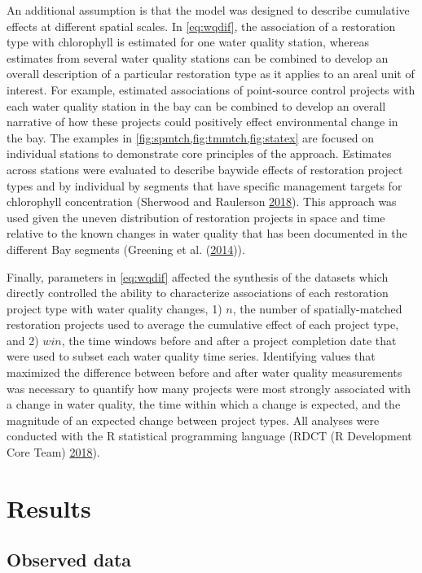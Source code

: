 \documentclass[]{article}
\begin{document}
An additional assumption is that the model was designed to describe
cumulative effects at different spatial scales. In \cref{eq:wqdif}, the
association of a restoration type with chlorophyll is estimated for one
water quality station, whereas estimates from several water quality
stations can be combined to develop an overall description of a
particular restoration type as it applies to an areal unit of interest.
For example, estimated associations of point-source control projects
with each water quality station in the bay can be combined to develop an
overall narrative of how these projects could positively effect
environmental change in the bay. The examples in
\cref{fig:spmtch,fig:tmmtch,fig:statex} are focused on individual
stations to demonstrate core principles of the approach. Estimates
across stations were evaluated to describe baywide effects of
restoration project types and by individual by segments that have
specific management targets for chlorophyll concentration (Sherwood and
Raulerson \protect\hyperlink{ref-Sherwood18}{2018}). This approach was
used given the uneven distribution of restoration projects in space and
time relative to the known changes in water quality that has been
documented in the different Bay segments (Greening et al.
(\protect\hyperlink{ref-Greening2014}{2014})).

Finally, parameters in \cref{eq:wqdif} affected the synthesis of the
datasets which directly controlled the ability to characterize
associations of each restoration project type with water quality
changes, 1) \(n\), the number of spatially-matched restoration projects
used to average the cumulative effect of each project type, and 2)
\(win\), the time windows before and after a project completion date
that were used to subset each water quality time series. Identifying
values that maximized the difference between before and after water
quality measurements was necessary to quantify how many projects were
most strongly associated with a change in water quality, the time within
which a change is expected, and the magnitude of an expected change
between project types. All analyses were conducted with the R
statistical programming language (RDCT (R Development Core Team)
\protect\hyperlink{ref-RDCT18}{2018}).

\hypertarget{results}{%
\section{Results}\label{results}}

\hypertarget{observed-data}{%
\subsection{Observed data}\label{observed-data}}
\end{document}
